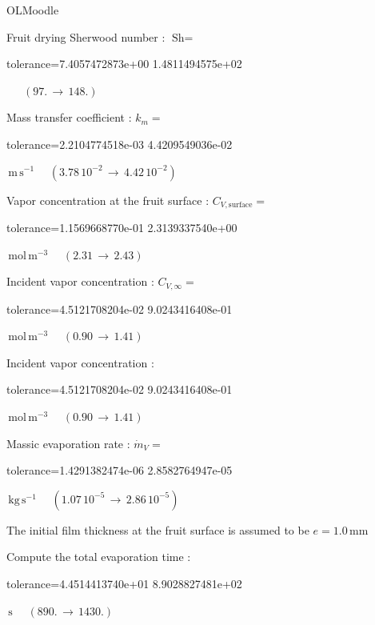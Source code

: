 \documentclass[12pt]{article}
\begin{document}
\begin{quiz}{OLMoodle}
\begin{cloze}{Fruit drying}
Sherwood number : $\text{Sh} =  $
\begin{numerical}[points=2] 
\item[tolerance={7.4057472873e+00}] 1.4811494575e+02 
\end{numerical} 
 $\,$ 
 $ \quad (97. \, \rightarrow \, 148.) $ 

Mass transfer coefficient : $k_m =  $
\begin{numerical}[points=1] 
\item[tolerance={2.2104774518e-03}] 4.4209549036e-02 
\end{numerical} 
 $\,  \mathrm{m}\,  \mathrm{s}^{-1}$ 
 $ \quad ( 3.78 \, 10^{-2}  \, \rightarrow \,  4.42 \, 10^{-2} ) $ 

Vapor concentration at the fruit surface : $C_{V, \text{surface}} =  $
\begin{numerical}[points=2] 
\item[tolerance={1.1569668770e-01}] 2.3139337540e+00 
\end{numerical} 
 $\,  \mathrm{mol}\,  \mathrm{m}^{-3}$ 
 $ \quad (2.31 \, \rightarrow \, 2.43) $ 

Incident  vapor concentration : $C_{V, \infty} =  $
\begin{numerical}[points=2] 
\item[tolerance={4.5121708204e-02}] 9.0243416408e-01 
\end{numerical} 
 $\,  \mathrm{mol}\,  \mathrm{m}^{-3}$ 
 $ \quad (0.90 \, \rightarrow \, 1.41) $ 

Incident  vapor concentration : 
\begin{numerical}[points=2] 
\item[tolerance={4.5121708204e-02}] 9.0243416408e-01 
\end{numerical} 
 $\,  \mathrm{mol}\,  \mathrm{m}^{-3}$ 
 $ \quad (0.90 \, \rightarrow \, 1.41) $ 

Massic evaporation rate : $\dot{m}_V =  $
\begin{numerical}[points=1] 
\item[tolerance={1.4291382474e-06}] 2.8582764947e-05 
\end{numerical} 
 $\,  \mathrm{kg}\,  \mathrm{s}^{-1}$ 
 $ \quad ( 1.07 \, 10^{-5}  \, \rightarrow \,  2.86 \, 10^{-5} ) $ 

 

The initial film thickness at the fruit surface is assumed to be $e = 1.0\,  \mathrm{mm} $

Compute the total evaporation time : 
\begin{numerical}[points=2] 
\item[tolerance={4.4514413740e+01}] 8.9028827481e+02 
\end{numerical} 
 $\,  \mathrm{s}$ 
 $ \quad (890. \, \rightarrow \, 1430.) $ 


\end{cloze}
\end{quiz}
\end{document}
